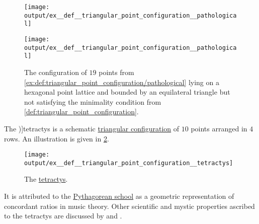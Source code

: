 \begin{example}
\begin{thmenum}
    \begin{figure}[!ht]
      \begin{subcaptionblock}{0.45\textwidth}
        \centering
        \texttt{[image: output/ex\_\_def\_\_triangular\_point\_configuration\_\_pathological]}
      \end{subcaptionblock}
      \hfill
      \begin{subcaptionblock}{0.45\textwidth}
        \centering
        \texttt{[image: output/ex\_\_def\_\_triangular\_point\_configuration\_\_pathological]}
      \end{subcaptionblock}
      \caption{The configuration of \( 19 \) points from \cref{ex:def:triangular_point_configuration/pathological} lying on a hexagonal point lattice and bounded by an equilateral triangle but not satisfying the minimality condition from \cref{def:triangular_point_configuration}.}\label{fig:ex:def:triangular_point_configuration/pathological}
    \end{figure}

     The \term[ru=тетрактида (\cite[99]{Жмудь1990ПифагорИстория})]{tetractys} is a schematic \hyperref[def:triangular_point_configuration]{triangular configuration} of \( 10 \) points arranged in \( 4 \) rows. An illustration is given in \cref{fig:ex:def:triangular_point_configuration/tetractys}.

    \begin{figure}[!ht]
      \centering
      \texttt{[image: output/ex\_\_def\_\_triangular\_point\_configuration\_\_tetractys]}
      \caption{The \hyperref[ex:def:triangular_point_configuration/tetractys]{tetractys}.}\label{fig:ex:def:triangular_point_configuration/tetractys}
    \end{figure}

    It is attributed to the \hyperref[rem:pythagoreanism]{Pythagorean school} as a geometric representation of concordant ratios in music theory. Other scientific and mystic properties ascribed to the tetractys are discussed  by  and .
  \end{thmenum}
\end{example}

